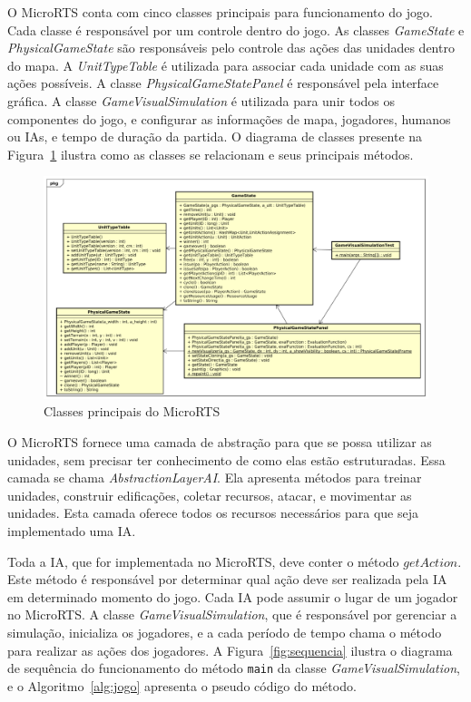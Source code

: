O MicroRTS conta com cinco classes principais para funcionamento do jogo. 
Cada classe é responsável por um controle dentro do jogo.
As classes \textit{GameState} e \textit{PhysicalGameState} são responsáveis pelo controle das ações das unidades dentro do mapa.
A \textit{UnitTypeTable} é utilizada para associar cada unidade com as suas ações possíveis.
A classe \textit{PhysicalGameStatePanel} é responsável pela interface gráfica.
A classe \textit{GameVisualSimulation} é utilizada para unir todos os componentes do jogo, e configurar as informações de mapa, jogadores, humanos ou IAs, e tempo de duração da partida.
O diagrama de classes presente na Figura~\ref{fig:classes} ilustra como as classes se relacionam e seus principais métodos.

\begin{figure}[ht]
	\centering
	\includegraphics[width=1\textwidth]{fig/classes.pdf}
	\caption{Classes principais do MicroRTS}
	\label{fig:classes}
\end{figure} 

O MicroRTS fornece uma camada de abstração para que se possa utilizar as unidades, sem precisar ter conhecimento de como elas estão estruturadas. 
Essa camada se chama \textit{AbstractionLayerAI}. 
Ela apresenta métodos para treinar unidades, construir edificações, coletar recursos, atacar, e movimentar as unidades. 
Esta camada oferece todos os recursos necessários para que seja implementado uma IA.

Toda a IA, que for implementada no MicroRTS, deve conter o método $\mathit{getAction}$.
Este método é responsável por determinar qual ação deve ser realizada pela IA em determinado momento do jogo.
Cada IA pode assumir o lugar de um jogador no MicroRTS. 
A classe \textit{GameVisualSimulation}, que é responsável por gerenciar a simulação, inicializa os jogadores, e a cada período de tempo chama o método para realizar as ações dos jogadores.
A Figura~\ref{fig:sequencia} ilustra o diagrama de sequência do funcionamento do método \texttt{main} da classe \textit{GameVisualSimulation}, e o Algoritmo~\ref{alg:jogo} apresenta o pseudo código do método.
 
